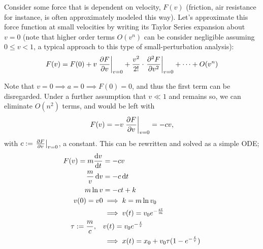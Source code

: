 \documentclass[12pt]{article}
\begin{document}
Consider some force that is dependent on velocity, $F(v)$ (friction, air resistance for instance, is often approximately modeled this way). Let's approximate this force function at small velocities by writing its Taylor Series expansion about $v= 0$ (note that higher order terms $O(v^n)$ can be consider negligible assuming $0 \leq v < 1$, a typical approach to this type of small-perturbation analysis):
$$F(v) = F(0) + v \eval{\pdv{F}{v}}_{v=0} + \frac{v^2}{2!}\cdot \eval{\pdv[2]{F}{v}}_{v=0} + \cdots + O(v^n)$$

Note that $v = 0 \implies a = 0 \implies F(0) = 0$, and thus the first term can be disregarded. Under a further assumption that $v\ll 1$ and remains so, we can eliminate $O(n^2)$ terms, and would be left with \[F(v) = - v \eval{\pdv{F}{v}}_{v=0} = -cv,\] with $c:=\eval{\pdv{F}{v}}_{v=0}$, a constant. This can be rewritten and solved as a simple ODE;
\begin{align*}
  F(v) = m \dv{v}{t} &= -cv\\
  \frac{m}{v} \dd{v} &=-c \dd{t}\\
  m \ln v &= -ct + k\\
  v(0) = v0 &\implies k = m \ln v_0\\
  &\implies v(t) = v_0 e^{-\frac{ct}{m}}\\
  \tau := \frac{m}{c},\quad& v(t) = v_0 e^{-\frac{t}{\tau}}\\
  &\implies x(t) = x_0 + v_0 \tau(1-e^{-\frac{t}{\tau}})
\end{align*}
\end{document}
